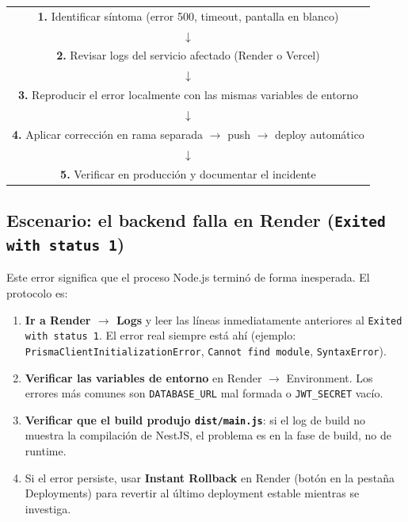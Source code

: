 \documentclass[12pt, a4paper]{article}
\begin{document}
\vspace{0.5em}
\begin{center}
\begin{tabular}{c}
    \textbf{1.} Identificar síntoma (error 500, timeout, pantalla en blanco) \\
    $\downarrow$ \\
    \textbf{2.} Revisar logs del servicio afectado (Render o Vercel) \\
    $\downarrow$ \\
    \textbf{3.} Reproducir el error localmente con las mismas variables de entorno \\
    $\downarrow$ \\
    \textbf{4.} Aplicar corrección en rama separada $\to$ push $\to$ deploy automático \\
    $\downarrow$ \\
    \textbf{5.} Verificar en producción y documentar el incidente \\
\end{tabular}
\end{center}
\vspace{0.5em}

\subsection{Escenario: el backend falla en Render (\texttt{Exited with status 1})}

Este error significa que el proceso Node.js terminó de forma inesperada. El protocolo es:

\begin{enumerate}
    \item \textbf{Ir a Render $\to$ Logs} y leer las líneas inmediatamente anteriores al
          \texttt{Exited with status 1}. El error real siempre está ahí
          (ejemplo: \texttt{PrismaClientInitializationError}, \texttt{Cannot find module}, \texttt{SyntaxError}).
    \item \textbf{Verificar las variables de entorno} en Render $\to$ Environment.
          Los errores más comunes son \texttt{DATABASE\_URL} mal formada o \texttt{JWT\_SECRET} vacío.
    \item \textbf{Verificar que el build produjo \texttt{dist/main.js}}: si el log de build no muestra
          la compilación de NestJS, el problema es en la fase de build, no de runtime.
    \item Si el error persiste, usar \textbf{Instant Rollback} en Render (botón en la pestaña Deployments)
          para revertir al último deployment estable mientras se investiga.
\end{enumerate}
\end{document}
